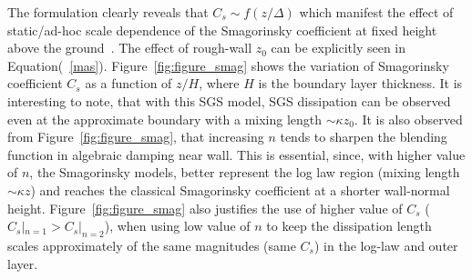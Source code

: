 \documentclass[times]{fldauth}
\begin{document}
The formulation clearly reveals that  $C_s \sim f(z/\Delta)$ which manifest the effect of static/ad-hoc scale dependence of the Smagorinsky coefficient at fixed height above the ground~\cite{porte1fun,bou1}. The effect of rough-wall $z_0$ can be explicitly seen in Equation(~\ref{mas}). Figure~\ref{fig:figure_smag} shows the variation of Smagorinsky coefficient $C_s$ as a function of $z/H$, where $H$ is the boundary layer thickness. It is interesting to note, that with this SGS model, SGS dissipation can be observed even at the approximate boundary with a mixing length $\sim \kappa z_0$. It is also observed from Figure~\ref{fig:figure_smag}, that increasing $n$ tends to sharpen the blending function in algebraic damping near wall. This is essential, since, with higher value of $n$, the Smagorinsky models, better represent the log law region (mixing length $\sim \kappa z$) and reaches the classical Smagorinsky coefficient at a shorter wall-normal height. Figure~\ref{fig:figure_smag} also justifies the use of higher value of $C_s$ ($C_s|_{n=1} > C_s|_{n=2}$), when using low value of $n$ to keep the dissipation length scales approximately of the same magnitudes (same $C_s$) in the log-law and outer layer.
\end{document}
